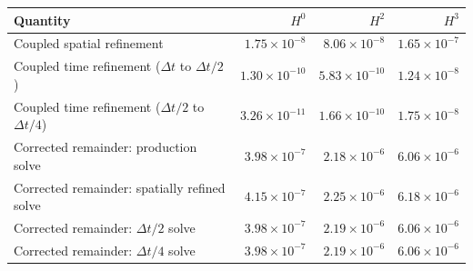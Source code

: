 \begin{tabular}{lrrr}
\toprule
Quantity & $H^0$ & $H^2$ & $H^3$\\
\midrule
Coupled spatial refinement & $1.75\times10^{-8}$ & $8.06\times10^{-8}$ & $1.65\times10^{-7}$\\
Coupled time refinement ($\Delta t$ to $\Delta t/2$) & $1.30\times10^{-10}$ & $5.83\times10^{-10}$ & $1.24\times10^{-8}$\\
Coupled time refinement ($\Delta t/2$ to $\Delta t/4$) & $3.26\times10^{-11}$ & $1.66\times10^{-10}$ & $1.75\times10^{-8}$\\
Corrected remainder: production solve & $3.98\times10^{-7}$ & $2.18\times10^{-6}$ & $6.06\times10^{-6}$\\
Corrected remainder: spatially refined solve & $4.15\times10^{-7}$ & $2.25\times10^{-6}$ & $6.18\times10^{-6}$\\
Corrected remainder: $\Delta t/2$ solve & $3.98\times10^{-7}$ & $2.19\times10^{-6}$ & $6.06\times10^{-6}$\\
Corrected remainder: $\Delta t/4$ solve & $3.98\times10^{-7}$ & $2.19\times10^{-6}$ & $6.06\times10^{-6}$\\
\bottomrule
\end{tabular}
